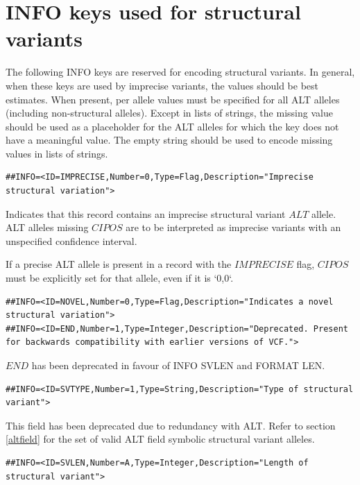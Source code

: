 \documentclass[8pt]{article}
\begin{document}
\section{INFO keys used for structural variants}
\label{sv-info-keys}
\begin{samepage}
The following INFO keys are reserved for encoding structural variants.
In general, when these keys are used by imprecise variants, the values should be best estimates.
When present, per allele values must be specified for all ALT alleles (including non-structural alleles).
Except in lists of strings, the missing value should be used as a placeholder for the ALT alleles for which the key does not have a meaningful value.
The empty string should be used to encode missing values in lists of strings.

\footnotesize
\begin{verbatim}
##INFO=<ID=IMPRECISE,Number=0,Type=Flag,Description="Imprecise structural variation">
\end{verbatim}
\normalsize

Indicates that this record contains an imprecise structural variant $ALT$ allele. ALT alleles missing $CIPOS$ are to be interpreted as imprecise variants with an unspecified confidence interval.

If a precise ALT allele is present in a record with the $IMPRECISE$ flag, $CIPOS$ must be explicitly set for that allele, even if it is `0,0`.

\footnotesize
\begin{verbatim}
##INFO=<ID=NOVEL,Number=0,Type=Flag,Description="Indicates a novel structural variation">
##INFO=<ID=END,Number=1,Type=Integer,Description="Deprecated. Present for backwards compatibility with earlier versions of VCF.">
\end{verbatim}
\normalsize

$END$ has been deprecated in favour of INFO SVLEN and FORMAT LEN.

\footnotesize
\begin{verbatim}
##INFO=<ID=SVTYPE,Number=1,Type=String,Description="Type of structural variant">
\end{verbatim}
\normalsize
\end{samepage}

This field has been deprecated due to redundancy with ALT.
Refer to section \ref{altfield} for the set of valid ALT field symbolic structural variant alleles.

\footnotesize
\begin{verbatim}
##INFO=<ID=SVLEN,Number=A,Type=Integer,Description="Length of structural variant">
\end{verbatim}
\normalsize
\end{document}

